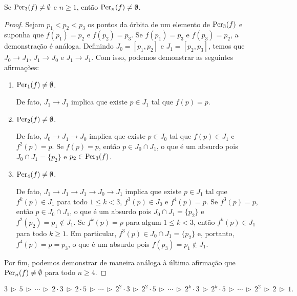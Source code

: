 \begin{theorem}
Se $\operatorname{Per}_3(f) \neq \emptyset$ e $n \geq 1$, então $\operatorname{Per}_n(f) \neq \emptyset$.
\end{theorem}

\begin{proof}
Sejam $p_1 < p_2 < p_3$ os pontos da órbita de um elemento de $\operatorname{Per}_3(f)$ e suponha que $f(p_1) = p_2$ e $f(p_2) = p_3$.
Se $f(p_1) = p_3$ e $f(p_3) = p_2$, a demonstração é análoga.
Definindo $J_0 = [p_1, p_2]$ e $J_1 = [p_2, p_3]$, temos que $J_0 \longrightarrow J_1$, $J_1 \longrightarrow J_0$ e $J_1 \longrightarrow J_1$. Com isso, podemos demonstrar as seguintes afirmações:

\begin{enumerate}[label=\alph*)]
\item $\operatorname{Per}_1(f) \neq \emptyset$.

De fato, $J_1 \longrightarrow J_1$ implica que existe $p \in J_1$ tal que $f(p) = p$.

\item $\operatorname{Per}_2(f) \neq \emptyset$.

De fato, $J_0 \longrightarrow J_1 \longrightarrow J_0$ implica que existe $p \in J_0$ tal que $f(p) \in J_1$ e $f^2(p) = p$.
Se $f(p) = p$, então $p \in J_0 \cap J_1$, o que é um absurdo pois $J_0 \cap J_1 = \{ p_2 \}$ e $p_2 \in \operatorname{Per}_3(f)$.

\item $\operatorname{Per}_4(f) \neq \emptyset$.

De fato, $J_1 \longrightarrow J_1 \longrightarrow J_1 \longrightarrow J_0 \longrightarrow J_1$ implica que existe $p \in J_1$ tal que $f^k(p) \in J_1$ para todo $1 \leq k < 3$, $f^3(p) \in J_0$ e $f^4(p) = p$.
Se $f^3(p) = p$, então $p \in J_0 \cap J_1$, o que é um absurdo pois $J_0 \cap J_1 = \{ p_2 \}$ e $f^2(p_2) = p_1 \notin J_1$.
Se $f^k(p) = p$ para algum $1 \leq k < 3$, então $f^k(p) \in J_1$ para todo $k \geq 1$.
Em particular, $f^3(p) \in J_0 \cap J_1 = \{ p_2 \}$ e, portanto, $f^4(p) = p = p_3$, o que é um absurdo pois $f(p_3) = p_1 \notin J_1$.
\end{enumerate}

Por fim, podemos demonstrar de maneira análoga à última afirmação que $\operatorname{Per}_n(f) \neq \emptyset$ para todo $n \geq 4$.
\end{proof}

\begin{definition}
$$3 \, \triangleright \, 5 
\, \triangleright \, \cdots \, \triangleright \,
2 \cdot 3 \, \triangleright \, 2 \cdot 5 
\, \triangleright \, \cdots \, \triangleright \,
2^2 \cdot 3 \, \triangleright \, 2^2 \cdot 5
\, \triangleright \, \cdots \, \triangleright \,
2^k \cdot 3 \, \triangleright \, 2^k \cdot 5
\, \triangleright \, \cdots \, \triangleright \,
2^2 \, \triangleright \, 2 \, \triangleright \, 1.$$
\end{definition}

